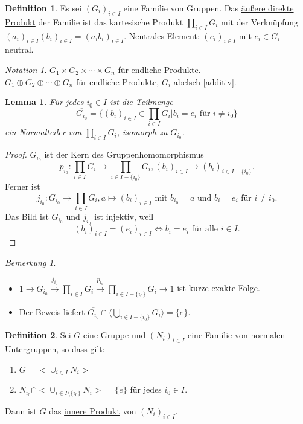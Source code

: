 \documentclass[12pt]{scrartcl}%
\newtheorem{lemma}{Lemma}
\theoremstyle{definition}
\newtheorem*{defn}{Definition}
\theoremstyle{remark}
\newtheorem*{notation}{Notation}
\newtheorem*{nb}{Bemerkung}
\begin{document}
\begin{defn}
	Es sei $(G_i)_{i \in I}$ eine Familie von Gruppen. Das \underline{äußere direkte Produkt} der Familie ist das kartesische Produkt $\prod_{i \in I}G_i$ mit der Verknüpfung $(a_i)_{i \in I} (b_i)_{i \in I} = (a_ib_i)_{i \in I}$. Neutrales Element: $(e_i)_{i \in I}$ mit $e_i \in G_i$ neutral.
\end{defn}

\begin{notation}
	$G_1 \times G_2 \times \dotsb \times G_n$ für endliche Produkte. \\
	$G_1 \oplus G_2 \oplus \dotsb \oplus G_n$ für endliche Produkte, $G_i$ abelsch [additiv].
\end{notation}

\begin{lemma}
	Für jedes $i_0 \in I$ ist die Teilmenge
	$$ \overline{G_{i_0}} = \{(b_i)_{i \in I} \in \prod_{i \in I}G_i | b_i = e_i \text{ für } i \neq i_0\} $$
	ein Normalteiler von $\prod_{i \in I}G_i$, isomorph zu $G_{i_0}$.
\end{lemma}

\begin{proof}
	$\overline{G_{i_0}}$ ist der Kern des Gruppenhomomorphismus
	$$p_{i_0}: \prod_{i \in I}G_i \rightarrow \prod_{i \in I-\{i_0\}}G_i, (b_i)_{i \in I} \mapsto (b_i)_{i \in I-\{i_0\}}.$$
	Ferner ist
	$$j_{i_0}: G_{i_0} \rightarrow \prod_{i \in I}G_i, a \mapsto (b_i)_{i \in I} \text{ mit } b_{i_0}=a \text{ und } b_i = e_i \text{ für } i \neq i_0.$$
	Das Bild ist $\overline{G_{i_0}}$ und $j_{i_0}$ ist injektiv, weil
	$$(b_i)_{i \in I} = (e_i)_{i \in I} \Leftrightarrow b_i = e_i \text{ für alle } i \in I.$$
\end{proof}

\begin{nb}
	\begin{itemize}
		\item $1 \longrightarrow G_{i_0} \stackrel{j_{i_0}}{\longrightarrow} \prod_{i \in I}G_i \stackrel{p_{i_0}}{\longrightarrow} \prod_{i \in I-\{i_0\}}G_i \longrightarrow 1$ ist kurze exakte Folge.
		\item Der Beweis liefert $\overline{G_{i_0}} \cap \langle \bigcup_{i \in I-\{i_0\}}G_i \rangle = \{e\}$.
	\end{itemize}
\end{nb}

\begin{defn}
    Sei $G$ eine Gruppe und $(N_i)_{i\in I}$ eine Familie von normalen Untergruppen, so dass gilt:

    \begin{enumerate}[label=(\roman*)]
        \item $G=<\cup_{i\in I} N_i>$
        \item $N_{i_0} \cap <\cup_{i\in I \setminus \{i_0\}} N_i> = \{e\}$ für jedes $i_0\in I$.
    \end{enumerate}

    Dann ist $G$ das \underline{innere Produkt} von $(N_i)_{i\in I}$.
\end{defn}
\end{document}
